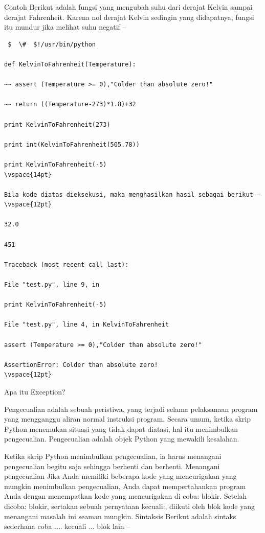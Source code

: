 Contoh Berikut adalah fungsi yang mengubah suhu dari derajat Kelvin sampai derajat Fahrenheit. Karena nol derajat Kelvin sedingin yang didapatnya, fungsi itu mundur jika melihat suhu negatif –
\vspace{12pt}
\begin{verbatim}
 $  \#  $!/usr/bin/python 
 
def KelvinToFahrenheit(Temperature): 

~~ assert (Temperature >= 0),"Colder than absolute zero!" 

~~ return ((Temperature-273)*1.8)+32 

print KelvinToFahrenheit(273) 

print int(KelvinToFahrenheit(505.78)) 

print KelvinToFahrenheit(-5) 
\vspace{14pt}

Bila kode diatas dieksekusi, maka menghasilkan hasil sebagai berikut – 
\vspace{12pt}

32.0 

451 

Traceback (most recent call last): 

File "test.py", line 9, in  

print KelvinToFahrenheit(-5) 

File "test.py", line 4, in KelvinToFahrenheit

assert (Temperature >= 0),"Colder than absolute zero!" 

AssertionError: Colder than absolute zero! 
\vspace{12pt}
\end{verbatim}
Apa itu Exception? 

Pengecualian adalah sebuah peristiwa, yang terjadi selama pelaksanaan program yang mengganggu aliran normal instruksi program. Secara umum, ketika skrip Python menemukan situasi yang tidak dapat diatasi, hal itu menimbulkan pengecualian. Pengecualian adalah objek Python yang mewakili kesalahan. 
\vspace{12pt}

Ketika skrip Python menimbulkan pengecualian, ia harus menangani pengecualian begitu saja sehingga berhenti dan berhenti. Menangani pengecualian Jika Anda memiliki beberapa kode yang mencurigakan yang mungkin menimbulkan pengecualian, Anda dapat mempertahankan program Anda dengan menempatkan kode yang mencurigakan di coba: blokir. Setelah dicoba: blokir, sertakan sebuah pernyataan kecuali:, diikuti oleh blok kode yang menangani masalah ini seaman mungkin. Sintaksis Berikut adalah sintaks sederhana coba .... kecuali ... blok lain – 
\vspace{12pt}

